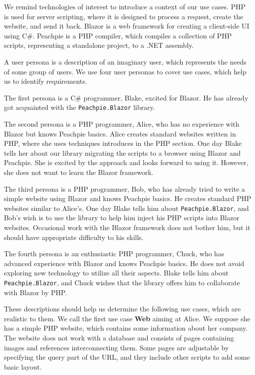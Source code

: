 We remind technologies of interest to introduce a context of our use cases.
PHP is used for server scripting, where it is designed to process a request, create the website, and send it back.
Blazor is a web framework for creating a client-side UI using C\#.
Peachpie is a PHP compiler, which compiles a collection of PHP scripts, representing a standalone project, to a .NET assembly.
\par
A user persona \cite{online:persona} is a description of an imaginary user, which represents the needs of some group of users.
We use four user personas to cover use cases, which help us to identify requirements.
\par
The first persona is a C\# programmer, Blake, excited for Blazor.
He has already got acquainted with the \texttt{Peachpie.Blazor} library.
\par
The second persona is a PHP programmer, Alice, who has no experience with Blazor but knows Peachpie basics.
Alice creates standard websites written in PHP, where she uses techniques introduces in the PHP section.
One day Blake tells her about our library migrating the scripts to a browser using Blazor and Peachpie.
She is excited by the approach and looks forward to using it.
However, she does not want to learn the Blazor framework.
\par
The third persona is a PHP programmer, Bob, who has already tried to write a simple website using Blazor and knows Peachpie basics.
He creates standard PHP websites similar to Alice's.
One day Blake tells him about \texttt{Peachpie.Blazor}, and Bob's wish is to use the library to help him inject his PHP scripts into Blazor websites.
Occasional work with the Blazor framework does not bother him, but it should have appropriate difficulty to his skills.
\par
The fourth persona is an enthusiastic PHP programmer, Chuck, who has advanced experience with Blazor and knows Peachpie basics.
He does not avoid exploring new technology to utilize all their aspects.
Blake tells him about \texttt{Peachpie.Blazor}, and Chuck wishes that the library offers him to collaborate with Blazor by PHP.
\par
These descriptions should help us determine the following use cases, which are realistic to them.
We call the first use case \textbf{Web} aiming at Alice.
We suppose she has a simple PHP website, which contains some information about her company.
The website does not work with a database and consists of pages containing images and references interconnecting them.
Some pages are adjustable by specifying the query part of the URL, and they include other scripts to add some basic layout.
